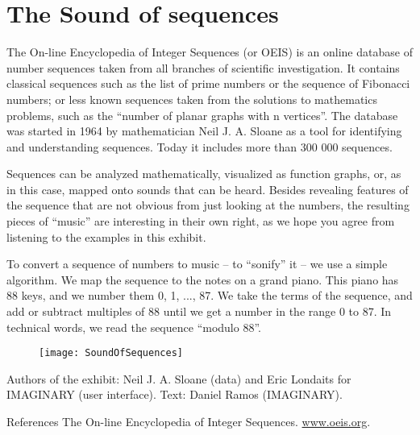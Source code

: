 \section{The Sound of sequences}
The On-line Encyclopedia of Integer Sequences (or OEIS) is an online database of number sequences taken from all branches of scientific investigation. It contains classical sequences such as the list of prime numbers or the sequence of Fibonacci numbers; or less known sequences taken from the solutions to mathematics problems, such as the ``number of planar graphs with n vertices''. The database was started in 1964 by mathematician Neil J. A. Sloane as a tool for identifying and understanding sequences. Today it includes more than 300 000 sequences.

Sequences can be analyzed mathematically, visualized as function graphs, or, as in this case, mapped onto sounds that can be heard. Besides revealing features of the sequence that are not obvious from just looking at the numbers, the resulting pieces of ``music'' are interesting in their own right, as we hope you agree from listening to the examples in this exhibit.

To convert a sequence of numbers to music -- to ``sonify'' it -- we use a simple algorithm. We map the sequence to the notes on a grand piano. This piano has 88 keys, and we number them 0, 1, ..., 87. We take the terms of the sequence, and add or subtract multiples of 88 until we get a number in the range 0 to 87.  In technical words, we read the sequence ``modulo 88''.

\begin{figure}[h]
\centering
\texttt{[image: SoundOfSequences]}
\end{figure}

\vfill

Authors of the exhibit: Neil J. A. Sloane (data) and Eric Londaits for IMAGINARY (user interface). Text: Daniel Ramos (IMAGINARY).

References
The On-line Encyclopedia of Integer Sequences. \url{www.oeis.org}.


